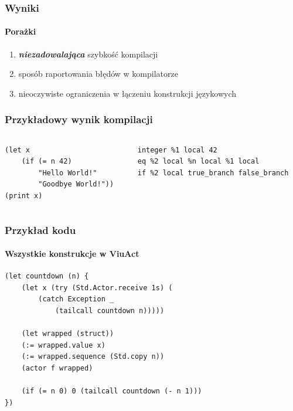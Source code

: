 \documentclass[aspectratio=169]{beamer}
\begin{document}
\begin{frame}
    \frametitle{Wyniki}
    \framesubtitle{Porażki}

    \begin{enumerate}
        \item \emph{\textbf{niezadowalająca}} szybkość kompilacji
        \item sposób raportowania błędów w kompilatorze
        \item nieoczywiste ograniczenia w łączeniu konstrukcji językowych
    \end{enumerate}
\end{frame}

\begin{frame}[fragile]
    \frametitle{Przykładowy wynik kompilacji}

    \begin{columns}
        \begin{column}{0.5\textwidth}
            \begin{small}
            \begin{lstlisting}
(let x
    (if (= n 42)
        "Hello World!"
        "Goodbye World!"))
(print x)
            \end{lstlisting}
            \end{small}
        \end{column}
        \begin{column}{0.5\textwidth}
            \begin{small}
            \begin{lstlisting}
integer %1 local 42
eq %2 local %n local %1 local
if %2 local true_branch false_branch
            \end{lstlisting}
            \end{small}
        \end{column}
    \end{columns}
\end{frame}

\begin{frame}[fragile]
    \frametitle{Przykład kodu}
    \framesubtitle{Wszystkie konstrukcje w ViuAct}

    \begin{small}
    \begin{lstlisting}
(let countdown (n) {
    (let x (try (Std.Actor.receive 1s) (
        (catch Exception _
            (tailcall countdown n)))))

    (let wrapped (struct))
    (:= wrapped.value x)
    (:= wrapped.sequence (Std.copy n))
    (actor f wrapped)

    (if (= n 0) 0 (tailcall countdown (- n 1)))
})
    \end{lstlisting}
    \end{small}
\end{frame}
\end{document}
